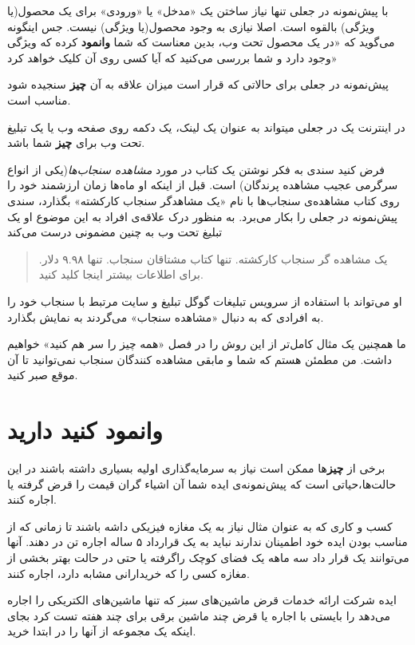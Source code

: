 با پیش‌نمونه در جعلی تنها نیاز ساختن یک «مدخل» یا «ورودی» برای یک
محصول(یا ویژگی) بالقوه است. اصلا نیازی به وجود محصول(یا ویژگی) نیست. جس
اینگونه می‌گوید که «در یک محصول تحت وب، بدین معناست که شما
\textbf{وانمود} کرده که ویژگی وجود دارد و شما بررسی می‌کنید که آیا کسی
روی آن کلیک خواهد کرد»

پیش‌نمونه در جعلی برای حالاتی که قرار است میزان علاقه به آن \textbf{چیز}
سنجیده شود مناسب است.

در اینترنت یک در جعلی میتواند به عنوان یک لینک، یک دکمه روی صفحه وب یا
یک تبلیغ تحت وب برای \textbf{چیز} شما باشد.

فرض کنید سندی به فکر نوشتن یک کتاب در مورد \emph{مشاهده سنجاب‌ها}(یکی از
انواع سرگرمی عجیب مشاهده پرندگان) است. قبل از اینکه او ماه‌ها زمان
ارزشمند خود را روی کتاب مشاهده‌ی سنجاب‌ها با نام «یک مشاهدگر سنجاب
کارکشته» بگذارد، سندی پیش‌نمونه در جعلی را بکار می‌برد. به منظور درک
علاقه‌ی افراد به این موضوع او یک تبلیغ تحت وب به چنین مضمونی درست می‌کند

\begin{quote}
یک مشاهده گر سنجاب کارکشته. تنها کتاب مشتاقان سنجاب. تنها ۹.۹۸ دلار.
برای اطلاعات بیشتر اینجا کلید کنید.
\end{quote}

او می‌تواند با استفاده از سرویس تبلیغات گوگل تبلیغ و سایت مرتبط با سنجاب
خود را به افرادی که به دنبال «مشاهده سنجاب» می‌گردند به نمایش بگذارد.

ما همچنین یک مثال کامل‌تر از این روش را در فصل «همه چیز را سر هم کنید»
خواهیم داشت. من مطمئن هستم که شما و مابقی مشاهده کنندگان سنجاب
نمی‌توانید تا آن موقع صبر کنید.

\section{وانمود کنید
دارید}\label{ux648ux627ux646ux645ux648ux62f-ux6a9ux646ux6ccux62f-ux62fux627ux631ux6ccux62f}

برخی از \textbf{چیز}ها ممکن است نیاز به سرمایه‌گذاری اولیه بسیاری داشته
باشند در این حالت‌ها،حیاتی است که پیش‌نمونه‌ی ایده شما آن اشیاء گران
قیمت را قرض گرفته یا اجاره کنند.

کسب و کاری که به عنوان مثال نیاز به یک مغازه فیزیکی داشه باشند تا زمانی
که از مناسب بودن ایده خود اطمینان ندارند نباید به یک قرارداد ۵ ساله
اجاره تن در دهند. آنها می‌توانند یک قرار داد سه ماهه یک فضای کوچک
راگرفته یا حتی در حالت بهتر بخشی از مغازه کسی را که خریدارانی مشابه
دارد، اجاره کنند.

ایده شرکت ارائه خدمات قرض ماشین‌های \emph{سبز} که تنها ماشین‌های
الکتریکی را اجاره می‌دهد را بایستی با اجاره یا قرض چند ماشین برقی برای
چند هفته تست کرد بجای اینکه یک مجموعه از آنها را در ابتدا خرید.

